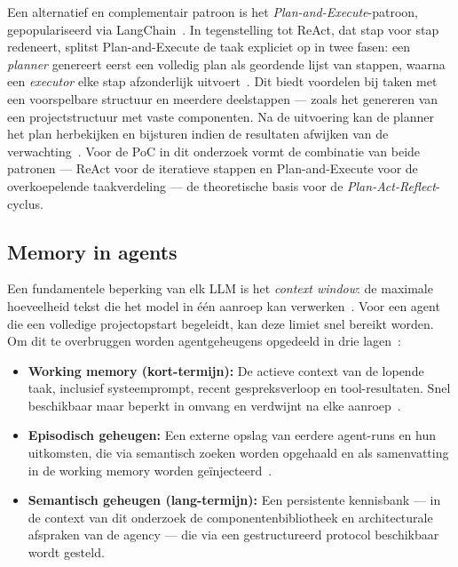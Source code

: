 Een alternatief en complementair patroon is het \textit{Plan-and-Execute}-patroon, gepopulariseerd via LangChain~\autocite{LangChain2023}. In tegenstelling tot ReAct, dat stap voor stap redeneert, splitst Plan-and-Execute de taak expliciet op in twee fasen: een \textit{planner} genereert eerst een volledig plan als geordende lijst van stappen, waarna een \textit{executor} elke stap afzonderlijk uitvoert~\autocite{LangGraph2022}. Dit biedt voordelen bij taken met een voorspelbare structuur en meerdere deelstappen --- zoals het genereren van een projectstructuur met vaste componenten. Na de uitvoering kan de planner het plan herbekijken en bijsturen indien de resultaten afwijken van de verwachting~\autocite{LangChain2023}. Voor de PoC in dit onderzoek vormt de combinatie van beide patronen --- ReAct voor de iteratieve stappen en Plan-and-Execute voor de overkoepelende taakverdeling --- de theoretische basis voor de \textit{Plan-Act-Reflect}-cyclus.

\subsection{Memory in agents}
\label{subsec:memory-agents}

Een fundamentele beperking van elk LLM is het \textit{context window}: de maximale hoeveelheid tekst die het model in één aanroep kan verwerken~\autocite{RedisBlog2026}. Voor een agent die een volledige projectopstart begeleidt, kan deze limiet snel bereikt worden. Om dit te overbruggen worden agentgeheugens opgedeeld in drie lagen~\autocite{Mikul2025}:

\begin{itemize}
\item \textbf{Working memory (kort-termijn):} De actieve context van de lopende taak, inclusief systeemprompt, recent gespreksverloop en tool-resultaten. Snel beschikbaar maar beperkt in omvang en verdwijnt na elke aanroep~\autocite{Schmid2025}.
\item \textbf{Episodisch geheugen:} Een externe opslag van eerdere agent-runs en hun uitkomsten, die via semantisch zoeken worden opgehaald en als samenvatting in de working memory worden geïnjecteerd~\autocite{Mikul2025}.
\item \textbf{Semantisch geheugen (lang-termijn):} Een persistente kennisbank --- in de context van dit onderzoek de componentenbibliotheek en architecturale afspraken van de agency --- die via een gestructureerd protocol beschikbaar wordt gesteld.
\end{itemize}

